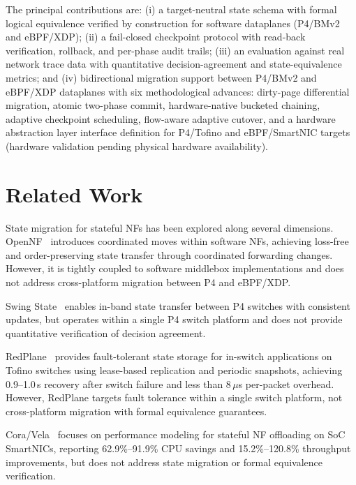 \documentclass[10pt, conference, compsoc]{IEEEtran}
\begin{document}
The principal contributions are: (i) a target-neutral state schema with formal
logical equivalence verified by construction for software dataplanes
(P4/BMv2 and eBPF/XDP); (ii) a fail-closed checkpoint protocol with read-back
verification, rollback, and per-phase audit trails; (iii) an evaluation against
real network trace data with quantitative decision-agreement and
state-equivalence metrics; and (iv) bidirectional migration support between
P4/BMv2 and eBPF/XDP dataplanes with six methodological advances: dirty-page
differential migration, atomic two-phase commit, hardware-native bucketed
chaining, adaptive checkpoint scheduling, flow-aware adaptive cutover, and a
hardware abstraction layer interface definition for P4/Tofino and eBPF/SmartNIC
targets (hardware validation pending physical hardware availability).

\section{Related Work}
\label{sec:related_work}

State migration for stateful NFs has been explored along several dimensions.
OpenNF~\cite{gember2014opennf} introduces coordinated moves within software NFs,
achieving loss-free and order-preserving state transfer through coordinated
forwarding changes. However, it is tightly coupled to software middlebox
implementations and does not address cross-platform migration between P4 and
eBPF/XDP.

Swing State~\cite{luo2017swing} enables in-band state transfer between P4
switches with consistent updates, but operates within a single P4 switch
platform and does not provide quantitative verification of decision agreement.

RedPlane~\cite{kim2021redplane} provides fault-tolerant state storage for
in-switch applications on Tofino switches using lease-based replication and
periodic snapshots, achieving 0.9--1.0\,s recovery after switch failure and less
than 8\,$\mu$s per-packet overhead. However, RedPlane targets fault tolerance
within a single switch platform, not cross-platform migration with formal
equivalence guarantees.

Cora/Vela~\cite{xi2024cora} focuses on performance modeling for stateful NF
offloading on SoC SmartNICs, reporting 62.9\%--91.9\% CPU savings and 15.2\%--120.8\%
throughput improvements, but does not address state migration or formal
equivalence verification.
\end{document}
